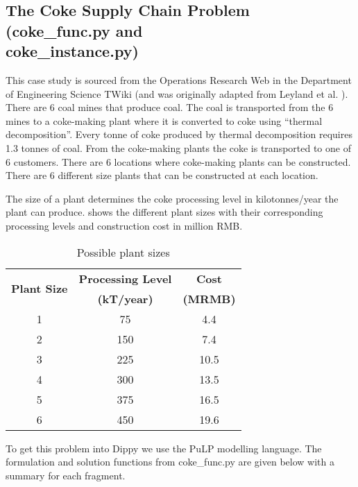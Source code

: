 \subsection{The Coke Supply Chain Problem (coke\_func.py and \\ coke\_instance.py)} \label{sbs:coke}

This case study is sourced from the Operations Research Web in the Department of Engineering Science TWiki \cite{coke} (and was originally adapted from Leyland et al. \cite{geoff_coke}). There are 6 coal mines that produce coal. The coal is transported from the 6 mines to a coke-making plant where it is converted to coke using ``thermal decomposition''. Every tonne of coke produced by thermal decomposition requires 1.3 tonnes of coal. From the coke-making plants the coke is transported to one of 6 customers. There are 6 locations where coke-making plants can be constructed. There are 6 different size plants that can be constructed at each location.

The size of a plant determines the coke processing level in kilotonnes/year the plant can produce.  shows the different plant sizes with their corresponding processing levels and construction cost in million RMB.
\begin{table}[htp]
\begin{center}
\begin{tabular}{|c|c|c|}
\hline
\multirow{2}{*}{\bf Plant Size} & {\bf Processing Level} & {\bf Cost} \\
 & {\bf (kT/year)} & {\bf (MRMB)} \\
\hline
1 & 75 & 4.4 \\
2 & 150 & 7.4 \\
3 & 225 & 10.5 \\
4 & 300 & 13.5 \\
5 & 375 & 16.5 \\
6 & 450 & 19.6 \\
\hline
\end{tabular}
\caption{Possible plant sizes} \label{tab:plant_size}
\end{center}
\end{table}

To get this problem into Dippy we use the PuLP modelling language.  The formulation and solution functions from coke\_func.py are given below with a summary for each fragment.

